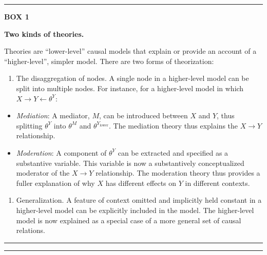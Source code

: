 \documentclass[
  12pt,
]{book}
\providecommand{\tightlist}{%
  \setlength{\itemsep}{0pt}\setlength{\parskip}{0pt}}
\begin{document}
\begin{center}\rule{0.5\linewidth}{0.5pt}\end{center}

\textbf{BOX 1}

\textbf{Two kinds of theories.}

Theories are ``lower-level'' causal models that explain or provide an account of a ``higher-level'', simpler model. There are two forms of theorization:

\begin{enumerate}
\def\labelenumi{\arabic{enumi}.}
\tightlist
\item
  The disaggregation of nodes. A single node in a higher-level model can be split into multiple nodes. For instance, for a higher-level model in which \(X \rightarrow Y \leftarrow \theta^Y\):
\end{enumerate}

\begin{itemize}
\tightlist
\item
  \emph{Mediation}: A mediator, \(M\), can be introduced between \(X\) and \(Y\), thus splitting \(\theta^Y\) into \(\theta^M\) and \(\theta^{Y_\text{lower}}\). The mediation theory thus explains the \(X \rightarrow Y\) relationship.
\item
  \emph{Moderation}: A component of \(\theta^Y\) can be extracted and specified as a substantive variable. This variable is now a substantively conceptualized moderator of the \(X \rightarrow Y\) relationship. The moderation theory thus provides a fuller explanation of why \(X\) has different effects on \(Y\) in different contexts.
\end{itemize}

\begin{enumerate}
\def\labelenumi{\arabic{enumi}.}
\setcounter{enumi}{1}
\tightlist
\item
  Generalization. A feature of context omitted and implicitly held constant in a higher-level model can be explicitly included in the model. The higher-level model is now explained as a special case of a more general set of causal relations.
\end{enumerate}

\begin{center}\rule{0.5\linewidth}{0.5pt}\end{center}

\begin{center}\rule{0.5\linewidth}{0.5pt}\end{center}
\end{document}
